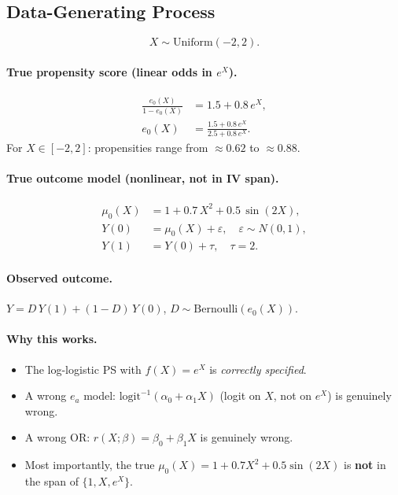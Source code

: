 \documentclass[11pt,letterpaper]{article}
\newcommand{\logit}{\mathrm{logit}}
\begin{document}
\subsection{Data-Generating Process}

\[
  X \sim \mathrm{Uniform}(-2, 2).
\]

\paragraph{True propensity score (linear odds in $e^X$).}
\begin{align}
  \frac{e_0(X)}{1 - e_0(X)} &= 1.5 + 0.8\,e^X, \\
  e_0(X) &= \frac{1.5 + 0.8\,e^X}{2.5 + 0.8\,e^X}.
\end{align}
For $X \in [-2,2]$: propensities range from ${\approx}0.62$ to ${\approx}0.88$.

\paragraph{True outcome model (nonlinear, not in IV span).}
\begin{align}
  \mu_0(X) &= 1 + 0.7\,X^2 + 0.5\,\sin(2X), \\
  Y(0) &= \mu_0(X) + \varepsilon, \quad \varepsilon \sim N(0,1), \\
  Y(1) &= Y(0) + \tau, \quad \tau = 2.
\end{align}

\paragraph{Observed outcome.}
$Y = D\,Y(1) + (1-D)\,Y(0)$, \quad $D \sim \mathrm{Bernoulli}(e_0(X))$.

\paragraph{Why this works.}
\begin{itemize}[nosep]
  \item The log-logistic PS with $f(X)=e^X$ is \emph{correctly specified}.
  \item A wrong $e_a$ model: $\logit^{-1}(\alpha_0 + \alpha_1 X)$
    (logit on $X$, not on $e^X$) is genuinely wrong.
  \item A wrong OR: $r(X;\beta) = \beta_0 + \beta_1 X$ is genuinely wrong.
  \item Most importantly, the true $\mu_0(X) = 1 + 0.7 X^2 + 0.5\sin(2X)$
    is \textbf{not} in the span of $\{1, X, e^X\}$.
\end{itemize}
\end{document}
